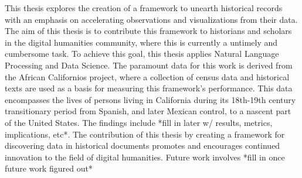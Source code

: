 This thesis explores the creation of a framework to unearth historical records with an emphasis on accelerating observations and visualizations from their data. The aim of this thesis is to contribute this framework to historians and scholars in the digital humanities community, where this is currently a untimely and cumbersome task. To achieve this goal, this thesis applies Natural Language Processing and Data Science. The paramount data for this work is derived from the African Californios project, where a collection of census data and historical texts are used as a basis for measuring this framework's performance. This data encompasses the lives of persons living in California during its 18th-19th century transitionary period from Spanish, and later Mexican control, to a nascent part of the United States. The findings include *fill in later w/ results, metrics, implications, etc*. The contribution of this thesis by creating a framework for discovering data in historical documents promotes and encourages continued innovation to the field of digital humanities. Future work involves *fill in once future work figured out*